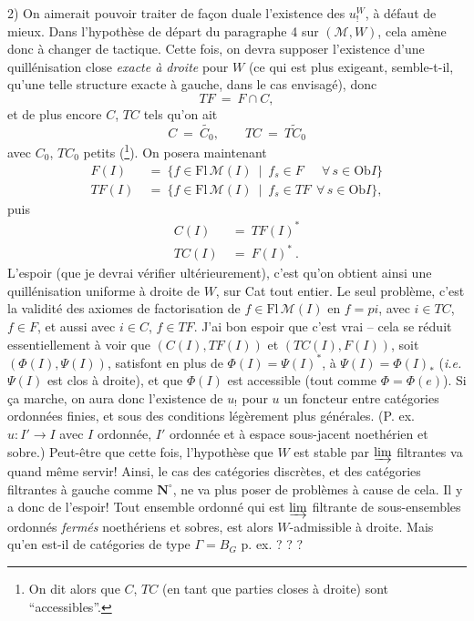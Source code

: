 \documentclass[11pt]{article}
\newcommand{\printedpage}[1]{\marginpar{\footnotesize p.~#1}}
\newcommand{\msp}[1]{\marginpar{\footnotesize [#1]}}
\newcommand{\Ob}{\mathrm{Ob}}
\newcommand{\M}{\mathcal{M}}
\newcommand{\Fl}{\mathrm{Fl}\,}
\begin{document}
2) On aimerait pouvoir traiter de façon duale l'existence des $u_!^W$, à défaut de mieux. Dans l'hypothèse de départ du paragraphe 4 sur $(\M,W)$, cela amène donc à changer de tactique. Cette fois, on devra supposer l'existence d'une quillénisation close \textit{exacte à droite} pour $W$ (ce qui est plus exigeant, semble-t-il, qu'une telle structure exacte à gauche, dans le cas envisagé), donc
\[
TF \ = \ F \cap C,
\]
\msp{page 75}
et de plus encore $C$, $TC$ tels qu'on ait
\[
C \ = \ \widetilde{C_0}, \qquad TC \ = \ \widetilde{TC_0}
\]
avec $C_0$, $TC_0$ petits (\footnote[38]{On dit alors que $C$, $TC$ (en tant que parties closes à droite) sont “accessibles”.}). On posera maintenant
\[
\begin{aligned}
F(I) \ &= \ \{f \in \Fl \M(I) \ \mid \ f_s \in F \quad\ \ \forall\, s \in \Ob I\}\\
TF(I) \ &= \ \{f \in \Fl \M(I) \ \mid \ f_s \in TF \ \ \forall\, s \in \Ob I\},
\end{aligned}
\]
puis
\[
\begin{aligned}
C(I) \ &= \ TF(I)^*\\
TC(I) \ &= \ F(I)^*\ .
\end{aligned}
\]
L'espoir (que je devrai vérifier ultérieurement), c'est qu'on obtient ainsi une quillénisation uniforme à droite de $W$, sur Cat tout entier. Le seul problème, c'est la validité des axiomes de factorisation de $f \in \Fl \M(I)$ en $f = pi$, avec $i \in TC$, $f \in F$, et aussi avec $i \in C$, $f \in TF$. %
J'ai bon espoir que c'est vrai -- cela se réduit essentiellement à voir que $(C(I),TF(I))$ et $(TC(I),F(I))$, soit $(\Phi(I),\Psi(I))$, satisfont en plus de $\Phi(I) = \Psi(I)^*$, à $\Psi(I) = \Phi(I)_*$ (\textit{i.e.} $\Psi(I)$ est clos à droite), et que $\Phi(I)$ est accessible (tout comme $\Phi = \Phi(e)$). Si ça marche, on aura donc l'existence
\printedpage{42}
\msp{page 76}
de $u_!$ pour $u$ un foncteur entre catégories ordonnées finies, et sous des conditions légèrement plus générales. (P. ex. $u : I' \longrightarrow I$ avec $I$ ordonnée, $I'$ ordonnée et à espace sous-jacent noethérien et sobre.) Peut-être que cette fois, l'hypothèse que $W$ est stable par $\varinjlim$ filtrantes va quand même servir! Ainsi, le cas des catégories discrètes, et des catégories filtrantes à gauche comme $\mathbf{N}^\circ$, ne va plus poser de problèmes à cause de cela. Il y a donc de l'espoir! Tout ensemble ordonné qui est $\varinjlim$ filtrante de sous-ensembles ordonnés \textit{fermés} noethériens et sobres, est alors $W$-admissible à droite. Mais qu'en est-il de catégories de type $\Gamma = B_G$ p. ex. ? ? ?
\end{document}

